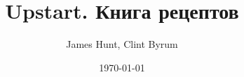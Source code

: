 \documentclass[a4paper]{scrbook}
\author{James Hunt, Clint Byrum}
\title{Upstart. Книга рецептов}
\date{\today}
\begin{document}
\maketitle
\makeindex


\end{document}
